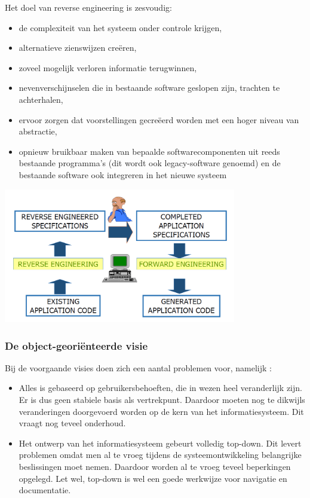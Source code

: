 Het doel van reverse engineering is zesvoudig:

\begin{itemize}
    \item de complexiteit van het systeem onder controle krijgen,
    \item alternatieve zienswijzen creëren,
    \item zoveel mogelijk verloren informatie terugwinnen,
    \item nevenverschijnselen die in bestaande software geslopen zijn, trachten te achterhalen,
    \item ervoor zorgen dat voorstellingen gecreëerd worden met een hoger niveau van abstractie,
    \item opnieuw bruikbaar maken van bepaalde softwarecomponenten uit reeds bestaande programma's (dit wordt ook legacy-software genoemd) en de bestaande software ook integreren in het nieuwe systeem
\end{itemize}


\begin{center}
\includegraphics[width=4in]{img/reverseengineering}%
\label{reverseengineering}%
\end{center}

\subsubsection{De object-georiënteerde visie}

Bij de voorgaande visies doen zich een aantal problemen voor, namelijk :

\begin{itemize}
    \item Alles is gebaseerd op gebruikersbehoeften, die in wezen heel veranderlijk zijn. Er is dus geen stabiele basis als vertrekpunt. Daardoor moeten nog te dikwijls veranderingen doorgevoerd worden op de kern van het informatiesysteem. Dit vraagt nog teveel onderhoud.
    \item Het ontwerp van het informatiesysteem gebeurt volledig top-down. Dit levert problemen omdat men al te vroeg tijdens de systeemontwikkeling belangrijke beslissingen moet nemen. Daardoor worden al te vroeg teveel beperkingen opgelegd. Let wel, top-down is wel een goede werkwijze voor navigatie en documentatie.
\end{itemize}

